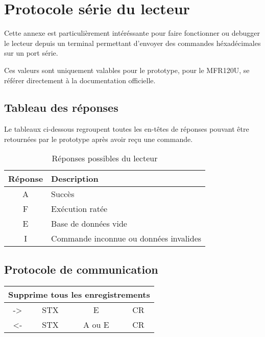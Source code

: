 \chapter{Protocole série du lecteur}

    Cette annexe est particulièrement intéréssante pour faire fonctionner ou debugger
le lecteur depuis un terminal permettant d'envoyer des commandes héxadécimales sur
un port série. 

    Ces valeurs sont uniquement valables pour le prototype, pour le MFR120U, se 
référer directement à la documentation officielle.

\section{Tableau des réponses}

    Le tableaux ci-dessous regroupent toutes les en-têtes de réponses pouvant être
retournées par le prototype après avoir reçu une commande.

\begin{table}[h]
\begin{center}

    \begin{tabular}{|c|M{3cm}|}
    \hline
    Réponse & Description \tabularnewline
    \hline
    A & Succès \tabularnewline
    \hline
    F & Exécution ratée \tabularnewline
    \hline
    E & Base de données vide \tabularnewline
    \hline
    I & Commande inconnue ou données invalides \tabularnewline
    \hline
    \end{tabular}

\end{center}
\caption{Réponses possibles du lecteur}
\label{Réponses possibles du lecteur}
\end{table}





\newpage
\section{Protocole de communication}

\begin{table}[h]
\begin{center}
    \begin{tabular}{|c|c|c|c|c|}
    \hline
    \multicolumn{5}{|c|}{Supprime tous les enregistrements} \\
    \hline
    -> & STX & \multicolumn{2}{c|}{E} & CR \\
    \hline
    <- & STX & \multicolumn{2}{c|}{A ou E} & CR \\
    \hline
    \end{tabular} 
\end{center}
\end{table}

